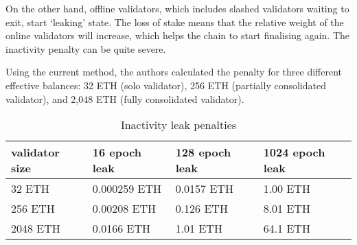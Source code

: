 On the other hand, offline validators, which includes slashed validators waiting to exit, start `leaking' state. The loss of stake means that the relative weight of the online validators will increase, which helps the chain to start finalising again. The inactivity penalty can be quite severe. 

Using the current method, the authors calculated the penalty for three different effective balances: 32 ETH (solo validator), 256 ETH (partially consolidated validator),  and 2,048 ETH (fully consolidated validator).

\begin{table}[htp]
\caption{Inactivity leak penalties}
\begin{center}
\renewcommand{\arraystretch}{1.3}
\begin{tabular}{|l|l|l|l|}
\hline
\textbf{validator size} & \textbf{16 epoch leak} & \textbf{128 epoch leak} & \textbf{1024 epoch leak} \\
\hline
32 ETH & 0.000259 ETH & 0.0157 ETH & 1.00 ETH \\
256 ETH & 0.00208 ETH & 0.126 ETH & 8.01 ETH \\
2048 ETH & 0.0166 ETH & 1.01 ETH & 64.1 ETH \\
\hline
\end{tabular}
\end{center}
\label{default}
\end{table}%

